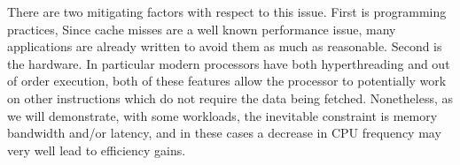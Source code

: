 There are two mitigating factors with respect to this issue. First is programming practices, Since cache misses are a well known performance issue, many applications are already written to avoid them as much as reasonable. Second is the hardware. In particular modern processors have both hyperthreading and out of order execution, both of these features allow the processor to potentially work on other instructions which do not require the data being fetched. Nonetheless, as we will demonstrate, with some workloads, the inevitable constraint is memory bandwidth and/or latency, and in these cases a decrease in CPU frequency may very well lead to efficiency gains.




